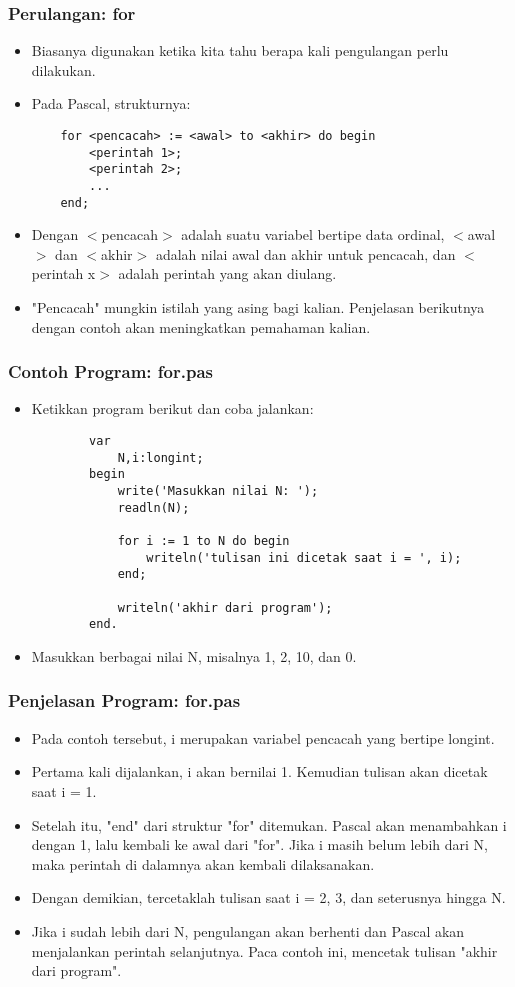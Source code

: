 \documentclass{beamer}
\begin{document}
\begin{frame}[fragile]
\frametitle{Perulangan: for}
\begin{itemize}
	\item Biasanya digunakan ketika kita tahu berapa kali pengulangan perlu dilakukan.
	\item Pada Pascal, strukturnya:
	\begin{lstlisting}
	for <pencacah> := <awal> to <akhir> do begin
	    <perintah 1>;
	    <perintah 2>;
	    ...
	end;
	\end{lstlisting}
	\item Dengan $<$pencacah$>$ adalah suatu variabel bertipe data \alert{ordinal}, $<$awal$>$ dan $<$akhir$>$ adalah nilai awal dan akhir untuk pencacah, dan $<$perintah x$>$ adalah perintah yang akan diulang.
	\item "Pencacah" mungkin istilah yang asing bagi kalian. Penjelasan berikutnya dengan contoh akan meningkatkan pemahaman kalian.
\end{itemize}
\end{frame}

\begin{frame}[fragile]
\frametitle{Contoh Program: for.pas}
\begin{itemize}
	\item Ketikkan program berikut dan coba jalankan:
	\begin{lstlisting}
		var
		    N,i:longint;
		begin
		    write('Masukkan nilai N: ');
		    readln(N);
		
		    for i := 1 to N do begin
		        writeln('tulisan ini dicetak saat i = ', i);
		    end;
		    
		    writeln('akhir dari program');
		end.
	\end{lstlisting}
	\item Masukkan berbagai nilai N, misalnya 1, 2, 10, dan 0.
\end{itemize}
\end{frame}

\begin{frame}
\frametitle{Penjelasan Program: for.pas}
\begin{itemize}
	\item Pada contoh tersebut, i merupakan variabel pencacah yang bertipe longint.
	\item Pertama kali dijalankan, i akan bernilai 1. Kemudian tulisan akan dicetak saat i = 1.
	\item Setelah itu, "end" dari struktur "for" ditemukan. Pascal akan menambahkan i dengan 1, lalu kembali ke awal dari "for". Jika i masih belum lebih dari N, maka perintah di dalamnya akan kembali dilaksanakan.
	\item Dengan demikian, tercetaklah tulisan saat i = 2, 3, dan seterusnya hingga N.
	\item Jika i sudah lebih dari N, pengulangan akan berhenti dan Pascal akan menjalankan perintah selanjutnya. Paca contoh ini, mencetak tulisan "akhir dari program".
\end{itemize}
\end{frame}
\end{document}

